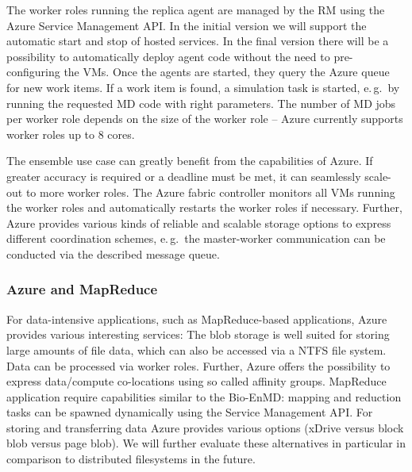 \documentclass[graybox]{svmult}
\begin{document}
The worker roles running the replica agent are managed by the RM using
the Azure Service Management API. In the initial version we will
support the automatic start and stop of hosted services. In the final
version there will be a possibility to automatically deploy agent code
without the need to pre-configuring the VMs. Once the agents are
started, they query the Azure queue for new work items. If a work item
is found, a simulation task is started, e.\,g.\ by running the requested
MD code with right parameters.  The number of
MD jobs per worker role depends on the size of the worker role --
Azure currently supports worker roles up to 8 cores.


The ensemble use case can greatly benefit from the
capabilities of Azure. If greater accuracy is required or a deadline
must be met, it can seamlessly scale-out to more worker roles.  The
Azure fabric controller monitors all VMs running the worker roles and
automatically restarts the worker roles if necessary. Further, Azure
provides various kinds of reliable and scalable storage options to
express different coordination schemes, e.\,g.\ the master-worker
communication can be conducted via the described message queue. 

\subsubsection{Azure and MapReduce}

For data-intensive applications, such as MapReduce-based applications,
Azure provides various interesting services: 
The blob storage is well suited for storing large amounts of file data, 
which can also be accessed via a NTFS file system. Data can be processed 
via worker roles. Further, Azure offers the possibility to express data/compute 
co-locations using so called affinity groups. MapReduce application require capabilities 
similar to the Bio-EnMD: mapping and reduction tasks can be spawned dynamically using the Service 
Management API. For storing and transferring data Azure provides various options
(xDrive versus block blob versus page blob). We will further evaluate these alternatives
in particular in comparison to distributed filesystems in the future. 


\end{document}

